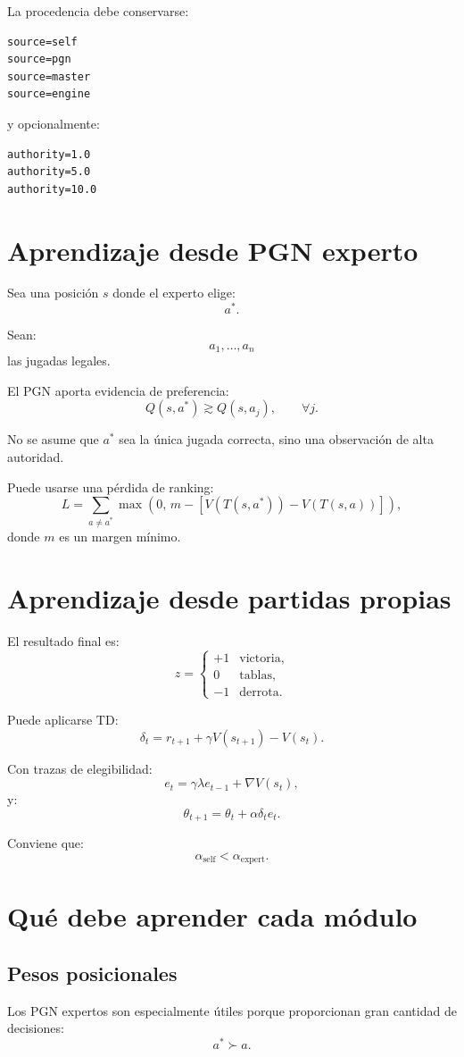 \documentclass[11pt,a4paper]{article}
\begin{document}
La procedencia debe conservarse:
\begin{lstlisting}
source=self
source=pgn
source=master
source=engine
\end{lstlisting}

y opcionalmente:
\begin{lstlisting}
authority=1.0
authority=5.0
authority=10.0
\end{lstlisting}

\section{Aprendizaje desde PGN experto}
Sea una posición $s$ donde el experto elige:
\[
a^*.
\]

Sean:
\[
a_1,\ldots,a_n
\]
las jugadas legales.

El PGN aporta evidencia de preferencia:
\[
Q(s,a^*) \gtrsim Q(s,a_j),
\qquad \forall j.
\]

No se asume que $a^*$ sea la única jugada correcta, sino una observación de alta autoridad.

Puede usarse una pérdida de ranking:
\[
L=
\sum_{a\neq a^*}
\max
\left(
0,\,
m-
\left[
V(T(s,a^*))-V(T(s,a))
\right]
\right),
\]
donde $m$ es un margen mínimo.

\section{Aprendizaje desde partidas propias}
El resultado final es:
\[
z=
\begin{cases}
+1 & \text{victoria},\\
0 & \text{tablas},\\
-1 & \text{derrota}.
\end{cases}
\]

Puede aplicarse TD:
\[
\delta_t
=
r_{t+1}
+
\gamma V(s_{t+1})
-
V(s_t).
\]

Con trazas de elegibilidad:
\[
e_t=
\gamma\lambda e_{t-1}
+
\nabla V(s_t),
\]
y:
\[
\theta_{t+1}
=
\theta_t
+
\alpha\delta_t e_t.
\]

Conviene que:
\[
\alpha_{\text{self}}
<
\alpha_{\text{expert}}.
\]

\section{Qué debe aprender cada módulo}
\subsection*{Pesos posicionales}
Los PGN expertos son especialmente útiles porque proporcionan gran cantidad de decisiones:
\[
a^*\succ a.
\]
\end{document}

